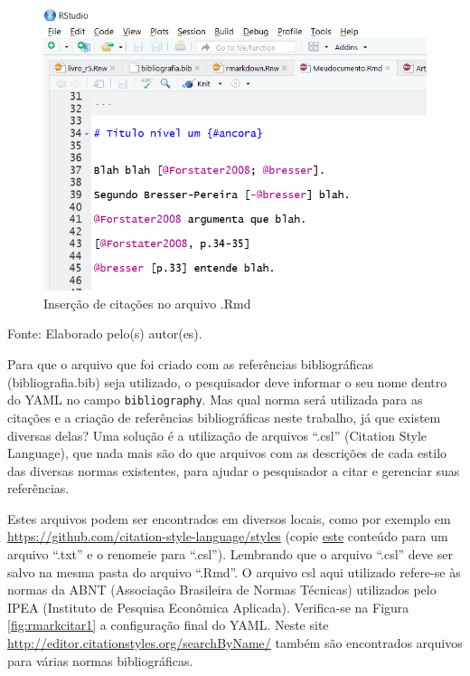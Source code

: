 \documentclass[12pt,portuguese,oneside]{book}
\begin{document}
\begin{figure}[H]

{\centering \includegraphics[width=0.8\linewidth]{rmarkcitar} 

}

\caption{Inserção de citações no arquivo .Rmd}\label{fig:rmarkcitar}
\end{figure}

Fonte: Elaborado pelo(s) autor(es).

Para que o arquivo que foi criado com as referências bibliográficas
(bibliografia.bib) seja utilizado, o pesquisador deve informar o seu
nome dentro do YAML no campo \texttt{bibliography}. Mas qual norma será
utilizada para as citações e a criação de referências bibliográficas
neste trabalho, já que existem diversas delas? Uma solução é a
utilização de arquivos ``.csl'' (Citation Style Language), que nada mais
são do que arquivos com as descrições de cada estilo das diversas normas
existentes, para ajudar o pesquisador a citar e gerenciar suas
referências.

Estes arquivos podem ser encontrados em diversos locais, como por
exemplo em \url{https://github.com/citation-style-language/styles}
(copie
\href{https://raw.githubusercontent.com/citation-style-language/styles/44808db510152943c5d9dc471a9c8982a3edfbea/associacao-brasileira-de-normas-tecnicas-ipea.csl}{este}
conteúdo para um arquivo ``.txt'' e o renomeie para ``.csl''). Lembrando
que o arquivo ``.csl'' deve ser salvo na mesma pasta do arquivo
``.Rmd''. O arquivo csl aqui utilizado refere-se às normas da ABNT
(Associação Brasileira de Normas Técnicas) utilizados pelo IPEA
(Instituto de Pesquisa Econômica Aplicada). Verifica-se na Figura
\ref{fig:rmarkcitar1} a configuração final do YAML. Neste site
\url{http://editor.citationstyles.org/searchByName/} também são
encontrados arquivos para várias normas bibliográficas.
\end{document}
